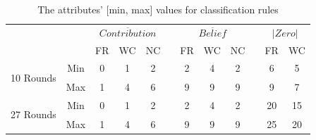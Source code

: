 \begin{table}[!h]
    
    \small
    \centering
    \caption{The attributes' [min, max] values for classification rules}
    \label{tab:minMaxPGGBothDataSets}
    \begin{tabular}{@{}cccccccccccc@{}}
        \toprule
        &    & \multicolumn{3}{c}{\textbf{$\overline{Contribution}$}} &  \phantom{abc}& \multicolumn{3}{c}{\textbf{$\overline{Belief}$}} &  \phantom{abc}& \multicolumn{2}{c}{\textbf{$\left |Zero\right |$}} \\
        
        \cmidrule{3-5} \cmidrule{7-9} \cmidrule{11-12}
        
        &    & FR                & WC                & NC    & \phantom{abc}           & FR              & WC              & NC     & \phantom{abc}        & FR                        & WC                        \\ \midrule
        
        
        \multirow{2}{*}{\begin{turn}{90}{\scriptsize 10 Rounds}\end{turn}}    
        & Min & 
        0                 & 1                 & 2     & \phantom{abc}           
        & 2               & 4               & 2      & \phantom{abc}        
        & 6                         & 5                         \\
        
        &Max & 
        1                 & 4                 & 6     & \phantom{abc}           
        & 9               & 9               & 9       & \phantom{abc}       
        & 9                         & 7\\
        
        \midrule
        
        \multirow{2}{*}{\begin{turn}{90}{\scriptsize 27 Rounds}\end{turn}}
        & Min & 
        0                 & 1                 & 2     & \phantom{abc}           
        & 2               & 4               & 2      & \phantom{abc}        
        & 20               & 15                         \\
        
        &Max & 
        1                 & 4                 & 6     & \phantom{abc}           
        & 9               & 9               & 9       & \phantom{abc}       
        & 25              & 20\\
        
        \bottomrule                        
    \end{tabular}
\end{table}

